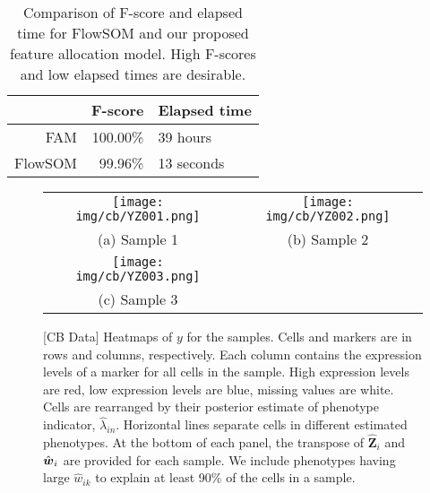 \documentclass[12pt,]{article}
\def\Z{\bm{Z}}
\newcommand{\bw}{\mbox{\boldmath $w$}}
\begin{document}
\begin{table}[H]
\centering
\begin{tabular}{rrl}
  \hline
  & F-score & Elapsed time \\
  \hline
  FAM & 100.00\% & 39 hours \\
  FlowSOM & 99.96\% & 13 seconds \\
  \hline
\end{tabular}
\label{tab:fscores}
\caption{Comparison of F-score and elapsed time for FlowSOM and our proposed
feature allocation model. High F-scores and low elapsed times are desirable.}
\end{table}



\begin{figure}[th!]
\begin{center}
  \begin{tabular}{cc}
  \texttt{[image: img/cb/YZ001.png]}&
  \texttt{[image: img/cb/YZ002.png]}\\
  (a) Sample 1 & (b) Sample 2 \\
  \texttt{[image: img/cb/YZ003.png]} &\\
  (c) Sample 3 & \\
  \end{tabular}
\end{center}
\vspace{-0.05in}
\caption{[CB Data]  Heatmaps of $y$ for the samples. Cells and markers are in
rows and columns, respectively. Each column contains the expression levels of
a marker for all cells in the sample. High expression levels are red, low
expression levels are blue, missing values are white.   Cells are rearranged
by their posterior estimate of phenotype indicator, $\hat{\lambda}_{in}$.
Horizontal lines separate cells in different estimated phenotypes.
At the bottom of each panel, the transpose of $\hat{\Z}_i$
and $\hat{\bw}_i$ are provided for each sample. We include phenotypes having
large $\hat{w}_{ik}$ to explain at least 90\% of the cells in a sample.}
\label{fig:cb-post-Z}
\end{figure}

\end{document}
